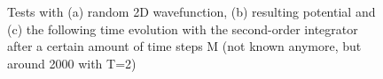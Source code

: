 \documentclass[11pt, letterpaper, onecolumn]{article}
\begin{document}
	\begin{figure}[h]	
	\begin{center}	
	\caption{Tests with (a) random 2D wavefunction, (b) resulting potential and (c) the following time evolution with the second-order integrator after a certain amount of time steps M (not known anymore, but around 2000 with T=2)}
	\label{fig:2D-so_integr}
	\end{center} 
	\end{figure}
	
	\newpage
	
\end{document}

